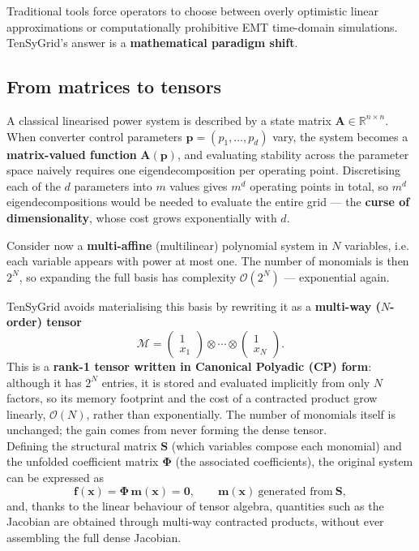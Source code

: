 \documentclass[11pt,a4paper]{article}
\begin{document}
Traditional tools force operators to choose between overly optimistic linear approximations or computationally prohibitive EMT time-domain simulations. TenSyGrid's answer is a \textbf{mathematical paradigm shift}.

\subsection*{From matrices to tensors}

A classical linearised power system is described by a state matrix $\mathbf{A} \in \mathbb{R}^{n \times n}$. When converter control parameters $\mathbf{p} = (p_1, \ldots, p_d)$ vary, the system becomes a \textbf{matrix-valued function} $\mathbf{A}(\mathbf{p})$, and evaluating stability across the parameter space naively requires one eigendecomposition per operating point. Discretising each of the $d$ parameters into $m$ values gives $m^d$ operating points in total, so $m^d$ eigendecompositions would be needed to evaluate the entire grid --- the \textbf{curse of dimensionality}, whose cost grows exponentially with $d$.

Consider now a \textbf{multi-affine} (multilinear) polynomial system in $N$ variables, i.e. each variable appears with power at most one. The number of monomials is then $2^{N}$, so expanding the full basis has complexity $\mathcal{O}(2^{N})$ --- exponential again.

TenSyGrid avoids materialising this basis by rewriting it as a \textbf{multi-way ($N$-order) tensor}
\[
  \mathcal{M} = \begin{pmatrix}
    1 \\ {x}_1
  \end{pmatrix}  \otimes \cdots \otimes \begin{pmatrix}
    1 \\ {x}_{N}
  \end{pmatrix}.
\]
This is a \textbf{rank-1 tensor written in Canonical Polyadic (CP) form}: although it has $2^{N}$ entries, it is stored and evaluated implicitly from only $N$ factors, so its memory footprint and the cost of a contracted product grow linearly, $\mathcal{O}(N)$, rather than exponentially. The number of monomials itself is unchanged; the gain comes from never forming the dense tensor.\\

Defining the structural matrix $\mathbf{S}$ (which variables compose each monomial) and the unfolded coefficient matrix $\boldsymbol{\Phi}$ (the associated coefficients), the original system can be expressed as
\begin{equation}
  \mathbf{f}(\mathbf{x})=\boldsymbol{\Phi}\,\mathbf{m}(\mathbf{x})=\mathbf{0},
  \qquad \mathbf{m}(\mathbf{x})\ \text{generated from}\ \mathbf{S},
\end{equation}
and, thanks to the linear behaviour of tensor algebra, quantities such as the Jacobian are obtained through multi-way contracted products, without ever assembling the full dense Jacobian.\\
\end{document}
